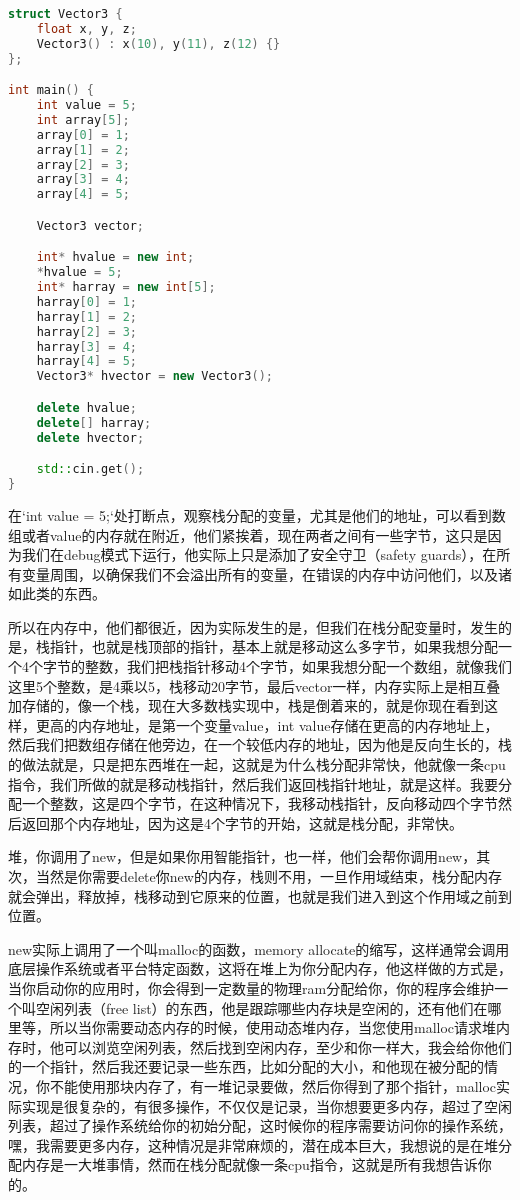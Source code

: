 \begin{lstlisting}[language=c++]
struct Vector3 {
    float x, y, z;
    Vector3() : x(10), y(11), z(12) {}
};

int main() {
    int value = 5;
    int array[5];
    array[0] = 1;
    array[1] = 2;
    array[2] = 3;
    array[3] = 4;
    array[4] = 5;

    Vector3 vector;

    int* hvalue = new int;
    *hvalue = 5;
    int* harray = new int[5];
    harray[0] = 1;
    harray[1] = 2;
    harray[2] = 3;
    harray[3] = 4;
    harray[4] = 5;
    Vector3* hvector = new Vector3();

    delete hvalue;
    delete[] harray;
    delete hvector;

    std::cin.get();
}
\end{lstlisting}

在`int value = 5;`处打断点，观察栈分配的变量，尤其是他们的地址，可以看到数组或者value的内存就在附近，他们紧挨着，现在两者之间有一些字节，这只是因为我们在debug模式下运行，他实际上只是添加了安全守卫（safety guards），在所有变量周围，以确保我们不会溢出所有的变量，在错误的内存中访问他们，以及诸如此类的东西。

所以在内存中，他们都很近，因为实际发生的是，但我们在栈分配变量时，发生的是，栈指针，也就是栈顶部的指针，基本上就是移动这么多字节，如果我想分配一个4个字节的整数，我们把栈指针移动4个字节，如果我想分配一个数组，就像我们这里5个整数，是4乘以5，栈移动20字节，最后vector一样，内存实际上是相互叠加存储的，像一个栈，现在大多数栈实现中，栈是倒着来的，就是你现在看到这样，更高的内存地址，是第一个变量value，int value存储在更高的内存地址上，然后我们把数组存储在他旁边，在一个较低内存的地址，因为他是反向生长的，栈的做法就是，只是把东西堆在一起，这就是为什么栈分配非常快，他就像一条cpu指令，我们所做的就是移动栈指针，然后我们返回栈指针地址，就是这样。我要分配一个整数，这是四个字节，在这种情况下，我移动栈指针，反向移动四个字节然后返回那个内存地址，因为这是4个字节的开始，这就是栈分配，非常快。

堆，你调用了new，但是如果你用智能指针，也一样，他们会帮你调用new，其次，当然是你需要delete你new的内存，栈则不用，一旦作用域结束，栈分配内存就会弹出，释放掉，栈移动到它原来的位置，也就是我们进入到这个作用域之前到位置。

new实际上调用了一个叫malloc的函数，memory allocate的缩写，这样通常会调用底层操作系统或者平台特定函数，这将在堆上为你分配内存，他这样做的方式是，当你启动你的应用时，你会得到一定数量的物理ram分配给你，你的程序会维护一个叫空闲列表（free list）的东西，他是跟踪哪些内存块是空闲的，还有他们在哪里等，所以当你需要动态内存的时候，使用动态堆内存，当您使用malloc请求堆内存时，他可以浏览空闲列表，然后找到空闲内存，至少和你一样大，我会给你他们的一个指针，然后我还要记录一些东西，比如分配的大小，和他现在被分配的情况，你不能使用那块内存了，有一堆记录要做，然后你得到了那个指针，malloc实际实现是很复杂的，有很多操作，不仅仅是记录，当你想要更多内存，超过了空闲列表，超过了操作系统给你的初始分配，这时候你的程序需要访问你的操作系统，嘿，我需要更多内存，这种情况是非常麻烦的，潜在成本巨大，我想说的是在堆分配内存是一大堆事情，然而在栈分配就像一条cpu指令，这就是所有我想告诉你的。

